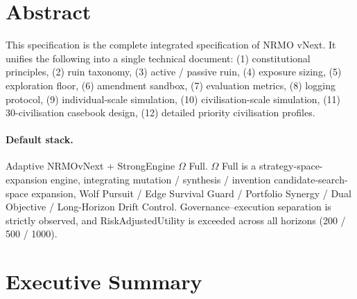 
\section*{Abstract}

This specification is the complete integrated specification of NRMO
vNext. It unifies the following into a single technical document:
(1) constitutional principles, (2) ruin taxonomy, (3) active /
passive ruin, (4) exposure sizing, (5) exploration floor, (6)
amendment sandbox, (7) evaluation metrics, (8) logging protocol,
(9) individual-scale simulation, (10) civilisation-scale simulation,
(11) 30-civilisation casebook design, (12) detailed priority
civilisation profiles.

\paragraph{Default stack.}
Adaptive NRMOvNext + StrongEngine $\Omega$ Full. $\Omega$ Full is a
strategy-space-expansion engine, integrating mutation / synthesis /
invention candidate-search-space expansion, Wolf Pursuit / Edge
Survival Guard / Portfolio Synergy / Dual Objective / Long-Horizon
Drift Control. Governance--execution separation is strictly observed,
and RiskAdjustedUtility is exceeded across all horizons
(200 / 500 / 1000).

\section{Executive Summary}
\label{sec:omega-executive-summary}

